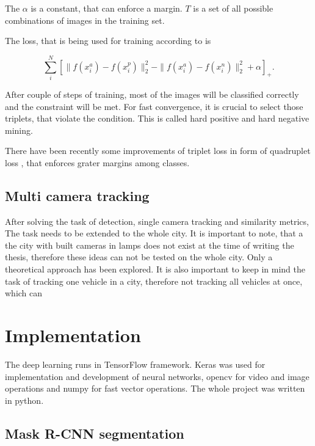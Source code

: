 \documentclass[a4paper,12pt,titlepage, twoside]{article}
\numberwithin{figure}{section}
\begin{document}
The $\alpha$ is a constant, that can enforce a margin. $T$ is a set of all possible combinations of images in the training set.

The loss, that is being used for training according to \cite{szegedy2016rethinking} is 

\begin{equation}
\sum_i^N [\|f(x_i^a) - f(x_i^p)\|^2_2 - \|f(x_i^a) - f(x_i^n)\|^2_2 + \alpha]_+.
\end{equation}

After couple of steps of training, most of the images will be classified correctly and the constraint will be met. For fast convergence, it is crucial to select those triplets, that violate the condition. This is called hard positive and hard negative mining.

There have been recently some improvements of triplet loss in form of quadruplet loss \cite{chen2017beyond}, that enforces grater margins among classes.

\subsection{Multi camera tracking}
\label{sec:multi-camera-tracking}
After solving the task of detection, single camera tracking and similarity metrics, The task needs to be extended to the whole city. It is important to note, that a the city with built cameras in lamps does not exist at the time of writing the thesis, therefore these ideas can not be tested on the whole city. Only a theoretical approach has been explored. It is also important to keep in mind the task of tracking one vehicle in a city, therefore not tracking all vehicles at once, which can 


\clearpage
\section{Implementation}

The deep learning runs in TensorFlow \cite{abadi2016tensorflow} framework. Keras \cite{chollet2015keras} was used for implementation and development of neural networks, opencv \cite{opencv} for video and image operations and numpy \cite{walt2011numpy} for fast vector operations. The whole project was written in python.


\subsection{Mask R-CNN segmentation}
\label{sec:mask-rcnn}
\end{document}
